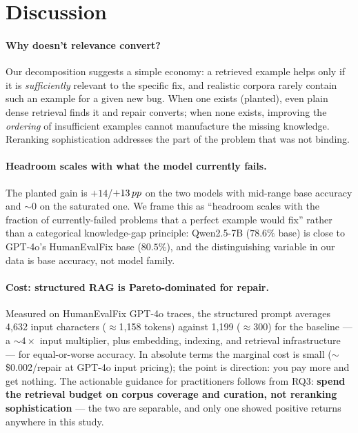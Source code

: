 \section{Discussion}
\label{sec:discussion}

\paragraph{Why doesn't relevance convert?} Our decomposition suggests a
simple economy: a retrieved example helps only if it is \emph{sufficiently}
relevant to the specific fix, and realistic corpora rarely contain such an
example for a given new bug. When one exists (planted), even plain dense
retrieval finds it and repair converts; when none exists, improving the
\emph{ordering} of insufficient examples cannot manufacture the missing
knowledge. Reranking sophistication addresses the part of the problem that
was not binding.

\paragraph{Headroom scales with what the model currently fails.} The planted
gain is $+14$/$+13\,pp$ on the two models with mid-range base accuracy and
$\sim 0$ on the saturated one. We frame this as ``headroom scales with the
fraction of currently-failed problems that a perfect example would fix''
rather than a categorical knowledge-gap principle: Qwen2.5-7B ($78.6\%$ base)
is close to GPT-4o's HumanEvalFix base ($80.5\%$), and the distinguishing
variable in our data is base accuracy, not model family.

\paragraph{Cost: structured RAG is Pareto-dominated for repair.} Measured on
HumanEvalFix GPT-4o traces, the structured prompt averages 4{,}632 input
characters ($\approx$1{,}158 tokens) against 1{,}199 ($\approx$300) for the
baseline --- a ${\sim}4\times$ input multiplier, plus embedding, indexing,
and retrieval infrastructure --- for equal-or-worse accuracy. In absolute
terms the marginal cost is small ($\sim$\$0.002/repair at GPT-4o input
pricing); the point is direction: you pay more and get nothing. The
actionable guidance for practitioners follows from RQ3: \textbf{spend the
retrieval budget on corpus coverage and curation, not reranking
sophistication} --- the two are separable, and only one showed positive
returns anywhere in this study.

